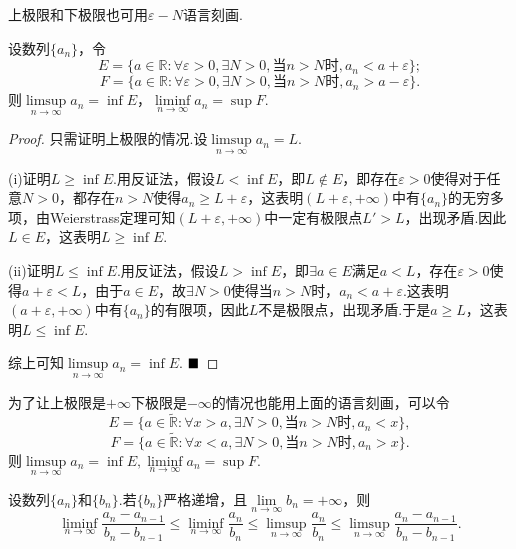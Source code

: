 上极限和下极限也可用$\varepsilon-N$语言刻画.
\begin{theorem}
	设数列$\{a_n\}$，令
	$$E=\{a\in\mathbb{R}:\forall\varepsilon>0,\exists N>0,\text{当}n>N\text{时},a_n<a+\varepsilon\};$$
	$$F=\{a\in\mathbb{R}:\forall\varepsilon>0,\exists N>0,\text{当}n>N\text{时},a_n>a-\varepsilon\}.$$
	则$\limsup\limits_{n\to\infty}a_n=\inf E$，$\liminf\limits_{n\to\infty}a_n=\sup F.$
\end{theorem}
\begin{proof}
	只需证明上极限的情况.设$\limsup\limits_{n\to\infty}a_n=L.$
	
	(i)证明$L\geqslant\inf E$.\quad 用反证法，假设$L<\inf E$，即$L\notin E$，即存在$\varepsilon>0$使得对于任意$N>0$，都存在$n>N$使得$a_n\geqslant L+\varepsilon$，这表明$(L+\varepsilon,+\infty)$中有$\{a_n\}$的无穷多项，由Weierstrass定理可知$(L+\varepsilon,+\infty)$中一定有极限点$L'>L$，出现矛盾.因此$L\in E$，这表明$L\geqslant \inf E$.
	
	(ii)证明$L\leqslant\inf E$.\quad 用反证法，假设$L>\inf E$，即$\exists a\in E$满足$a<L$，存在$\varepsilon>0$使得$a+\varepsilon<L$，由于$a\in E$，故$\exists N>0$使得当$n>N$时，$a_n<a+\varepsilon$.这表明$(a+\varepsilon,+\infty)$中有$\{a_n\}$的有限项，因此$L$不是极限点，出现矛盾.于是$a\geqslant L$，这表明$L\leqslant\inf E$.
	
	综上可知$\limsup\limits_{n\to\infty}a_n=\inf E.$ $\hfill\blacksquare$
\end{proof}
\begin{remark}
	为了让上极限是$+\infty$下极限是$-\infty$的情况也能用上面的语言刻画，可以令
	$$E=\{a\in\widetilde{\mathbb{R}}:\forall x>a,\exists N>0,\text{当}n>N\text{时},a_n<x\},$$
	$$F=\{a\in\widetilde{\mathbb{R}}:\forall x<a,\exists N>0,\text{当}n>N\text{时},a_n>x\}.$$
	则$\limsup\limits_{n\to\infty}a_n=\inf E,\liminf\limits_{n\to\infty}a_n=\sup F.$
\end{remark}
\begin{proposition}[Stolz定理的推广形式]
	设数列$\{a_n\}$和$\{b_n\}$.若$\{b_n\}$严格递增，且$\lim\limits_{n\to\infty}b_n=+\infty$，则
	$$\liminf\limits_{n\to\infty}\frac{a_n-a_{n-1}}{b_n-b_{n-1}}\leqslant\liminf\limits_{n\to\infty}\frac{a_n}{b_n}\leqslant\limsup\limits_{n\to\infty}\frac{a_n}{b_n}\leqslant\limsup\limits_{n\to\infty}\frac{a_n-a_{n-1}}{b_n-b_{n-1}}.$$
\end{proposition}
